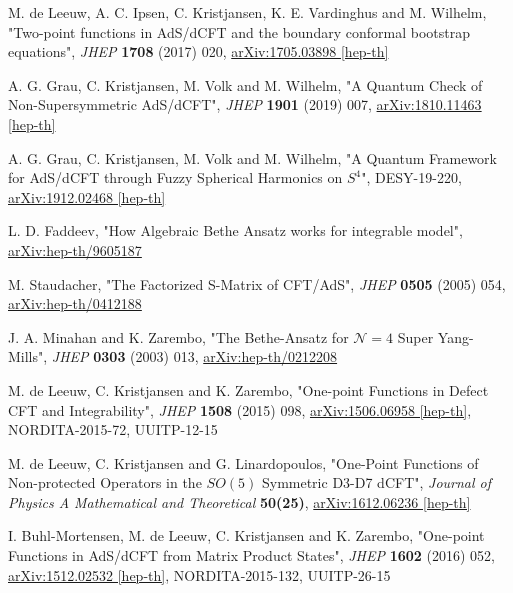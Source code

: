 \documentclass[a4paper,12pt]{article}
\theoremstyle{definition}
\theoremstyle{theorem}
\numberwithin{equation}{subsection}
\begin{document}
\begin{thebibliography}{9}
M. de Leeuw, A. C. Ipsen, C. Kristjansen, K. E. Vardinghus and M. Wilhelm, 
"Two-point functions in AdS/dCFT and the boundary conformal bootstrap equations", 
\textit{JHEP} \textbf{1708} (2017) 020, 
\href{http://arxiv.org/abs/1705.03898}{arXiv:1705.03898 [hep-th]}

A. G. Grau, C. Kristjansen, M. Volk and M. Wilhelm, 
"A Quantum Check of Non-Supersymmetric AdS/dCFT", 
\textit{JHEP} \textbf{1901} (2019) 007, 
\href{http://arxiv.org/abs/1810.11463}{arXiv:1810.11463 [hep-th]}

A. G. Grau, C. Kristjansen, M. Volk and M. Wilhelm, 
"A Quantum Framework for AdS/dCFT through Fuzzy Spherical Harmonics on $S^4$", 
DESY-19-220, 
\href{https://arxiv.org/abs/1912.02468}{arXiv:1912.02468 [hep-th]}

L. D. Faddeev, 
"How Algebraic Bethe Ansatz works for integrable model", 
\href{https://arxiv.org/abs/hep-th/9605187}{arXiv:hep-th/9605187}

M. Staudacher, 
"The Factorized S-Matrix of CFT/AdS", 
\textit{JHEP} \textbf{0505} (2005) 054, 
\href{https://arxiv.org/abs/hep-th/0412188}{arXiv:hep-th/0412188}

J. A. Minahan and K. Zarembo, 
"The Bethe-Ansatz for $\mathcal{N} = 4$ Super Yang-Mills", 
\textit{JHEP} \textbf{0303} (2003) 013, 
\href{https://arxiv.org/abs/hep-th/0212208}{arXiv:hep-th/0212208}

M. de Leeuw, C. Kristjansen and K. Zarembo, 
"One-point Functions in Defect CFT and Integrability", 
\textit{JHEP} \textbf{1508} (2015) 098, 
\href{https://arxiv.org/abs/1506.06958}{arXiv:1506.06958 [hep-th]},  
NORDITA-2015-72, UUITP-12-15

M. de Leeuw, C. Kristjansen and G. Linardopoulos, 
"One-Point Functions of Non-protected Operators in the $SO(5)$ Symmetric D3-D7 dCFT", 
\textit{Journal of Physics A Mathematical and Theoretical} \textbf{50(25)}, 
\href{https://arxiv.org/abs/1612.06236}{arXiv:1612.06236 [hep-th]}

I. Buhl-Mortensen, M. de Leeuw, C. Kristjansen and K. Zarembo, 
"One-point Functions in AdS/dCFT from Matrix Product States", 
\textit{JHEP} \textbf{1602} (2016) 052, 
\href{https://arxiv.org/abs/1512.02532}{arXiv:1512.02532 [hep-th]}, 
NORDITA-2015-132, UUITP-26-15


\end{thebibliography}
\end{document}
